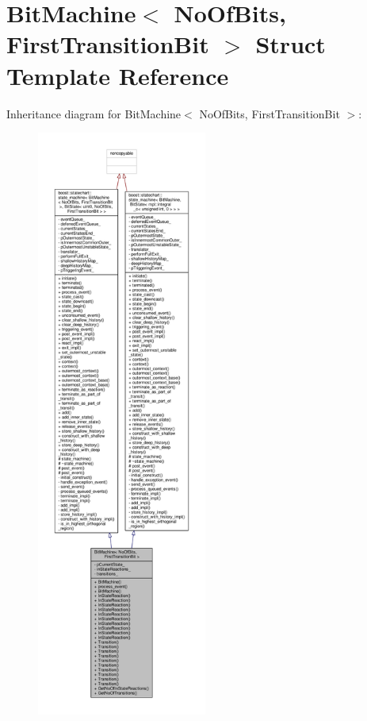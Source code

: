 \hypertarget{struct_bit_machine}{}\section{Bit\+Machine$<$ No\+Of\+Bits, First\+Transition\+Bit $>$ Struct Template Reference}
\label{struct_bit_machine}


Inheritance diagram for Bit\+Machine$<$ No\+Of\+Bits, First\+Transition\+Bit $>$\+:
\nopagebreak
\begin{figure}[H]
\begin{center}
\leavevmode
\includegraphics[height=550pt]{struct_bit_machine__inherit__graph}
\end{center}
\end{figure}


